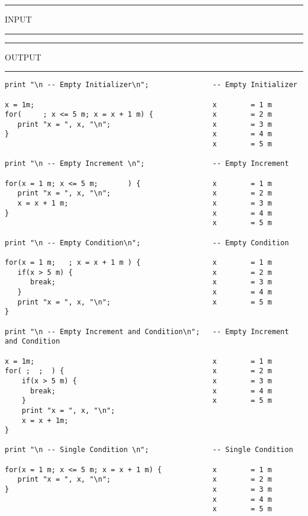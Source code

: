 \vspace{0.15 in}
\begin{footnotesize}
\noindent
\rule{1.2 in}{0.035 in} INPUT \rule{1.2 in}{0.035 in}\hspace{0.1 in}
\rule{1.3 in}{0.035 in} OUTPUT\rule{1.3 in}{0.035 in}
\begin{verbatim}
print "\n -- Empty Initializer\n";               -- Empty Initializer

x = 1m;                                          x        = 1 m
for(     ; x <= 5 m; x = x + 1 m) {              x        = 2 m
   print "x = ", x, "\n";                        x        = 3 m
}                                                x        = 4 m
                                                 x        = 5 m

print "\n -- Empty Increment \n";                -- Empty Increment

for(x = 1 m; x <= 5 m;       ) {                 x        = 1 m
   print "x = ", x, "\n";                        x        = 2 m
   x = x + 1 m;                                  x        = 3 m
}                                                x        = 4 m
                                                 x        = 5 m

print "\n -- Empty Condition\n";                 -- Empty Condition

for(x = 1 m;   ; x = x + 1 m ) {                 x        = 1 m
   if(x > 5 m) {                                 x        = 2 m
      break;                                     x        = 3 m
   }                                             x        = 4 m
   print "x = ", x, "\n";                        x        = 5 m
}

print "\n -- Empty Increment and Condition\n";   -- Empty Increment and Condition

x = 1m;                                          x        = 1 m
for( ;  ;  ) {                                   x        = 2 m
    if(x > 5 m) {                                x        = 3 m
      break;                                     x        = 4 m
    }                                            x        = 5 m
    print "x = ", x, "\n";
    x = x + 1m;
}

print "\n -- Single Condition \n";               -- Single Condition

for(x = 1 m; x <= 5 m; x = x + 1 m) {            x        = 1 m
   print "x = ", x, "\n";                        x        = 2 m
}                                                x        = 3 m
                                                 x        = 4 m
                                                 x        = 5 m


\end{verbatim}
\end{footnotesize}

